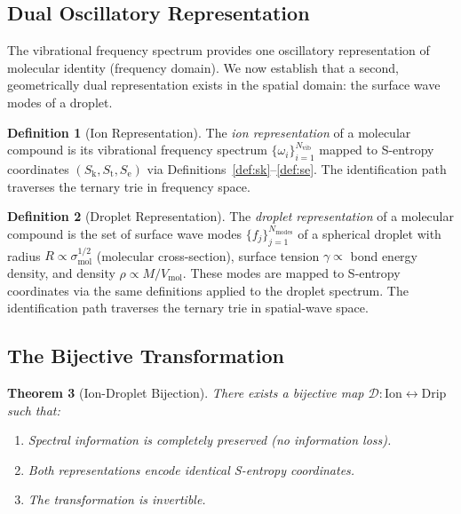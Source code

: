 \documentclass[11pt,twocolumn,a4paper]{article}
\newtheorem{theorem}{Theorem}[section]
\theoremstyle{definition}
\newtheorem{definition}[theorem]{Definition}
\theoremstyle{remark}
\newcommand{\Sk}{S_{\mathrm{k}}}
\newcommand{\St}{S_{\mathrm{t}}}
\newcommand{\Se}{S_{\mathrm{e}}}
\newcommand{\Nvib}{N_{\mathrm{vib}}}
\begin{document}
\subsection{Dual Oscillatory Representation}
\label{sec:dual-representation}

The vibrational frequency spectrum provides one oscillatory representation of molecular identity (frequency domain). We now establish that a second, geometrically dual representation exists in the spatial domain: the surface wave modes of a droplet.

\begin{definition}[Ion Representation]
\label{def:ion-repr}
The \emph{ion representation} of a molecular compound is its vibrational frequency spectrum $\{\omega_i\}_{i=1}^{\Nvib}$ mapped to S-entropy coordinates $(\Sk, \St, \Se)$ via Definitions~\ref{def:sk}--\ref{def:se}. The identification path traverses the ternary trie in frequency space.
\end{definition}

\begin{definition}[Droplet Representation]
\label{def:droplet-repr}
The \emph{droplet representation} of a molecular compound is the set of surface wave modes $\{f_j\}_{j=1}^{N_{\mathrm{modes}}}$ of a spherical droplet with radius $R \propto \sigma_{\mathrm{mol}}^{1/2}$ (molecular cross-section), surface tension $\gamma \propto$ bond energy density, and density $\rho \propto M/V_{\mathrm{mol}}$. These modes are mapped to S-entropy coordinates via the same definitions applied to the droplet spectrum. The identification path traverses the ternary trie in spatial-wave space.
\end{definition}

\subsection{The Bijective Transformation}
\label{sec:bijective-transformation}

\begin{theorem}[Ion-Droplet Bijection]
\label{thm:ion-droplet}
There exists a bijective map $\mathcal{D}: \mathrm{Ion} \leftrightarrow \mathrm{Drip}$ such that:
\begin{enumerate}[label=(\alph*)]
  \item Spectral information is completely preserved (no information loss).
  \item Both representations encode identical S-entropy coordinates.
  \item The transformation is invertible.
\end{enumerate}
\end{theorem}
\end{document}
